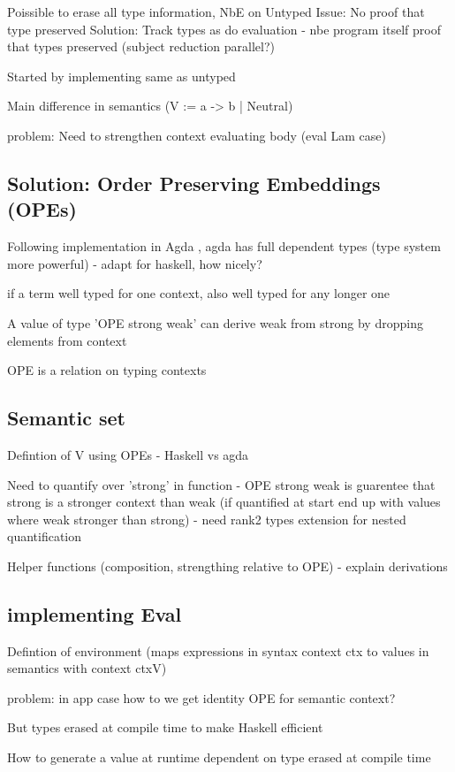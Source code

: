 Poissible to erase all type information, NbE on Untyped
Issue: No proof that type preserved 
Solution: Track types as do evaluation - nbe program itself proof that types preserved (subject reduction parallel?)

Started by implementing same as untyped

Main difference in semantics (V := a -> b | Neutral) 
\cite{slides}

problem: Need to strengthen context evaluating body (eval Lam case)
\subsection{Solution: Order Preserving Embeddings (OPEs)}

Following implementation in Agda \cite{AgdaNbe}, agda has full dependent types (type system more powerful) - adapt for haskell, how nicely? 

if a term well typed for one context, also well typed for any longer one

A value of type 'OPE strong weak' can derive weak from strong by dropping elements from context

OPE is a relation on typing contexts

\subsection{Semantic set}

Defintion of V using OPEs - Haskell vs agda

Need to quantify over 'strong' in function - OPE strong weak is guarentee that strong is a stronger context than weak (if quantified at start end up with values where weak stronger than strong) - need rank2 types extension for nested quantification

Helper functions (composition, strengthing relative to OPE) - explain derivations

\subsection{implementing Eval}

Defintion of environment (maps expressions in syntax context ctx to values in semantics with context ctxV)

problem: in app case how to we get identity OPE for semantic context?

But types erased at compile time to make Haskell efficient

How to generate a value at runtime dependent on type erased at compile time

